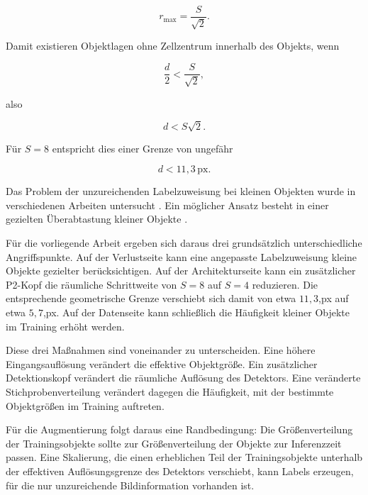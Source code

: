 \begin{equation}
r_{\mathrm{max}}
=
\frac{S}{\sqrt{2}}.
\end{equation}

Damit existieren Objektlagen ohne Zellzentrum innerhalb des Objekts, wenn

\begin{equation}
\frac{d}{2}
<
\frac{S}{\sqrt{2}},
\end{equation}

also

\begin{equation}
d<S\sqrt{2}.
\end{equation}

Für $S=8$ entspricht dies einer Grenze von ungefähr

\begin{equation}
d<11{,}3\,\mathrm{px}.
\end{equation}

Das Problem der unzureichenden Labelzuweisung bei kleinen Objekten wurde in verschiedenen Arbeiten untersucht \parencite{xu2022rfla,zhang2020atss}. Ein möglicher Ansatz besteht in einer gezielten Überabtastung kleiner Objekte \parencite{kisantal2019}.

Für die vorliegende Arbeit ergeben sich daraus drei grundsätzlich unterschiedliche Angriffspunkte. Auf der Verlustseite kann eine angepasste Labelzuweisung kleine Objekte gezielter berücksichtigen. Auf der Architekturseite kann ein zusätzlicher P2-Kopf die räumliche Schrittweite von $S=8$ auf $S=4$ reduzieren. Die entsprechende geometrische Grenze verschiebt sich damit von etwa $11{,}3$,px auf etwa $5{,}7$,px. Auf der Datenseite kann schließlich die Häufigkeit kleiner Objekte im Training erhöht werden.

Diese drei Maßnahmen sind voneinander zu unterscheiden. Eine höhere Eingangsauflösung verändert die effektive Objektgröße. Ein zusätzlicher Detektionskopf verändert die räumliche Auflösung des Detektors. Eine veränderte Stichprobenverteilung verändert dagegen die Häufigkeit, mit der bestimmte Objektgrößen im Training auftreten.

Für die Augmentierung folgt daraus eine Randbedingung: Die Größenverteilung der Trainingsobjekte sollte zur Größenverteilung der Objekte zur Inferenzzeit passen. Eine Skalierung, die einen erheblichen Teil der Trainingsobjekte unterhalb der effektiven Auflösungsgrenze des Detektors verschiebt, kann Labels erzeugen, für die nur unzureichende Bildinformation vorhanden ist.

